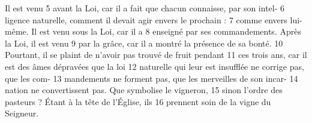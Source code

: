 Il est venu	 
5	 	avant la Loi, car il a fait que chacun connaisse, par son intel-	 
6	 	ligence naturelle, comment il devait agir envers le prochain :	 
7	 	comme envers lui-même. Il est venu sous la Loi, car il a	 
8	 	enseigné par ses commandements. Après la Loi, il est venu	 
9	 	par la grâce, car il a montré la présence de sa bonté.	 
10	 	Pourtant, il se plaint de n'avoir pas trouvé de fruit pendant	 
11	 	ces trois ans, car il est des âmes dépravées que la loi	 
12	 	naturelle qui leur est insufflée ne corrige pas, que les com-	 
13	 	mandements ne forment pas, que les merveilles de son incar-	 
14	 	nation ne convertissent pas. Que symbolise le vigneron,	 
15	 	sinon l'ordre des pasteurs ? Étant à la tête de l'Église, ils	 
16	 	prennent soin de la vigne du Seigneur.
